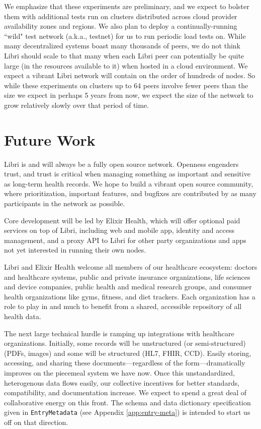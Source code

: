 \documentclass[10pt]{article}
\newcommand{\ttt}[1]{\texttt{#1}}
\begin{document}
We emphasize that these experiments are preliminary, and we expect to bolster them with additional tests run on clusters distributed across cloud provider availability zones and regions. We also plan to deploy a continually-running ``wild" test network (a.k.a., testnet) for us to run periodic load tests on. While many decentralized systems boast many thousands of peers, we do not think Libri should scale to that many when each Libri peer can potentially be quite large (in the resources available to it) when hosted in a cloud environment. We expect a vibrant Libri network will contain on the order of hundreds of nodes. So while these experiments on clusters up to 64 peers involve fewer peers than the size we expect in perhaps 5 years from now, we expect the size of the network to grow relatively slowly over that period of time.


\section{Future Work}
\label{sec:future}
Libri is and will always be a fully open source network. Openness engenders trust, and trust is critical when managing something as important and sensitive as long-term health records. We hope to build a vibrant open source community, where prioritization, important features, and bugfixes are contributed by as many participants in the network as possible. 

Core development will be led by Elixir Health, which will offer optional paid services on top of Libri, including web and mobile app, identity and access management, and a proxy API to Libri for other  party organizations and apps not yet interested in running their own nodes.

Libri and Elixir Health welcome all members of our healthcare ecosystem: doctors and healthcare systems, public and private insurance organizations, life sciences and device companies, public health and medical research groups, and consumer health organizations like gyms, fitness, and diet trackers. Each organization has a role to play in and much to benefit from a shared, accessible repository of all health data.

The next large technical hurdle is ramping up integrations with healthcare organizations. Initially, some records will be unstructured (or semi-structured) (PDFs, images) and some will be structured (HL7, FHIR, CCD). Easily storing, accessing, and sharing these documents---regardless of the form---dramatically improves on the piecemeal system we have now. Once this unstandardized, heterogenous data flows easily, our collective incentives for better standards, compatibility, and documentation increase. We expect to spend a great deal of collaborative energy on this front. The schema and data dictionary specification given in \ttt{EntryMetadata} (see Appendix \ref{app:entry-meta}) is intended to start us off on that direction. 
\end{document}
